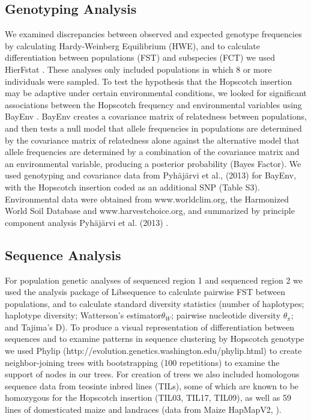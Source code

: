 \documentclass[12pt]{article}
\begin{document}
\subsection{Genotyping Analysis}

We examined discrepancies between observed and expected genotype frequencies by calculating Hardy-Weinberg Equilibrium (HWE), and to calculate differentiation between populations (FST) and subspecies (FCT) we used HierFstat \cite{Goudet 2005}. These analyses only included populations in which 8 or more individuals were sampled. To test the hypothesis that the Hopscotch insertion may be adaptive under certain environmental conditions, we looked for significant associations between the Hopscotch frequency and environmental variables using BayEnv \cite{Coop et al 2010}. BayEnv creates a covariance matrix of relatedness between populations, and then tests a null model that allele frequencies in populations are determined by the covariance matrix of relatedness alone against the alternative model that allele frequencies are determined by a combination of the covariance matrix and an environmental variable, producing a posterior probability (Bayes Factor)\cite{Coop et al 2010}. We used genotyping and covariance data from Pyhäjärvi et al., (2013) \cite{Pyhajarvi et al 2013} for BayEnv, with the Hopscotch insertion coded as an additional SNP (Table S3). Environmental data were obtained from www.worldclim.org, the Harmonized World Soil Database and www.harvestchoice.org, and summarized by principle component analysis Pyhäjärvi et al. (2013) \cite{Pyhajarvi et al 2013}.

\subsection{Sequence Analysis}

For population genetic analyses of sequenced region 1 and sequenced region 2 we used the analysis package of Libsequence \cite{Thornton 2003} to calculate pairwise FST between populations, and to calculate standard diversity statistics (number of haplotypes; haplotype diversity; Watterson's estimator$\theta_{W}$; pairwise nucleotide diversity $\theta_{\pi}$; and Tajima's D). To produce a visual representation of differentiation between sequences and to examine patterns in sequence clustering by Hopscotch genotype we used Phylip (http://evolution.genetics.washington.edu/phylip.html) to create neighbor-joining trees with bootstrapping (100 repetitions) to examine the support of nodes in our trees. For creation of trees we also included homologous sequence data from teosinte inbred lines (TILs), some of which are known to be homozygous for the Hopscotch insertion (TIL03, TIL17, TIL09), as well as 59 lines of domesticated maize and landraces (data from Maize HapMapV2, \cite{Chia et al 2012}).
\end{document}

